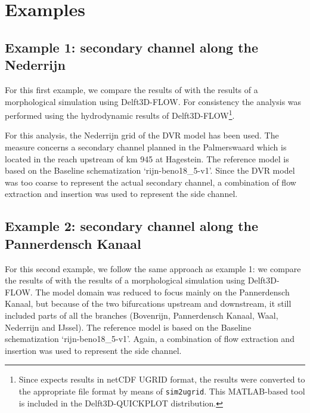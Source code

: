 \chapter{Examples}

\section{Example 1: secondary channel along the Nederrijn}

For this first example, we compare the results of \dfastmi with the results of a morphological simulation using Delft3D-FLOW.
For consistency the \dfastmi analysis was performed using the hydrodynamic results of Delft3D-FLOW\footnote{Since \dfastmi expects \dflowfm results in netCDF UGRID format, the results were converted to the appropriate file format by means of \texttt{sim2ugrid}.
This MATLAB-based tool is included in the Delft3D-QUICKPLOT distribution.}.

For this analysis, the Nederrijn grid of the DVR model has been used.
The measure concerns a secondary channel planned in the Palmerswaard which is located in the reach upstream of km 945 at Hagestein.
The reference model is based on the Baseline schematization ‘rijn-beno18\_5-v1’.
Since the DVR model was too coarse to represent the actual secondary channel, a combination of flow extraction and insertion was used to represent the side channel.


\section{Example 2: secondary channel along the Pannerdensch Kanaal}

For this second example, we follow the same approach as example 1: we compare the results of \dfastmi with the results of a morphological simulation using Delft3D-FLOW.
The model domain was reduced to focus mainly on the Pannerdensch Kanaal, but because of the two bifurcations upstream and downstream, it still included parts of all the branches (Bovenrijn, Pannerdensch Kanaal, Waal, Nederrijn and IJssel).
The reference model is based on the Baseline schematization ‘rijn-beno18\_5-v1’.
Again, a combination of flow extraction and insertion was used to represent the side channel.

